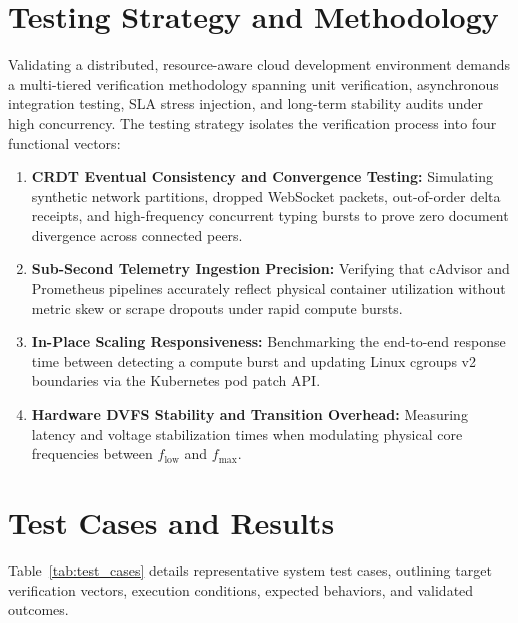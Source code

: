 \documentclass[12pt,a4paper]{report}
\begin{document}
	\section{Testing Strategy and Methodology}
	Validating a distributed, resource-aware cloud development environment demands a multi-tiered verification methodology spanning unit verification, asynchronous integration testing, SLA stress injection, and long-term stability audits under high concurrency. The testing strategy isolates the verification process into four functional vectors:
	\begin{enumerate}
		\item \textbf{CRDT Eventual Consistency and Convergence Testing:} Simulating synthetic network partitions, dropped WebSocket packets, out-of-order delta receipts, and high-frequency concurrent typing bursts to prove zero document divergence across connected peers.
		\item \textbf{Sub-Second Telemetry Ingestion Precision:} Verifying that cAdvisor and Prometheus pipelines accurately reflect physical container utilization without metric skew or scrape dropouts under rapid compute bursts.
		\item \textbf{In-Place Scaling Responsiveness:} Benchmarking the end-to-end response time between detecting a compute burst and updating Linux cgroups v2 boundaries via the Kubernetes pod patch API.
		\item \textbf{Hardware DVFS Stability and Transition Overhead:} Measuring latency and voltage stabilization times when modulating physical core frequencies between $f_{\text{low}}$ and $f_{\max}$.
	\end{enumerate}
	
	\section{Test Cases and Results}
	Table~\ref{tab:test_cases} details representative system test cases, outlining target verification vectors, execution conditions, expected behaviors, and validated outcomes.
	
\end{document}
